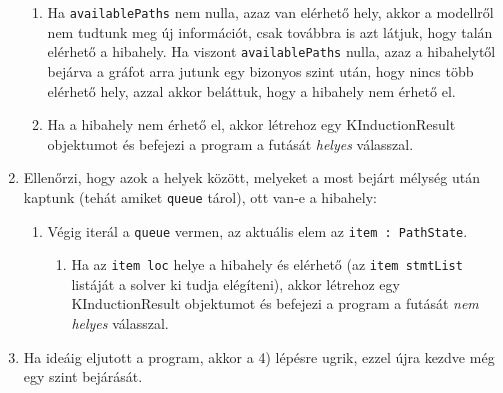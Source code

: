 \begin{enumerate}
\begin{enumerate}
		\item Ha \texttt{availablePaths} nem nulla, azaz van elérhető hely, akkor a modellről nem tudtunk meg új információt, csak továbbra is azt látjuk, hogy talán elérhető a hibahely. Ha viszont \texttt{availablePaths} nulla, azaz a hibahelytől bejárva a gráfot arra jutunk egy bizonyos szint után, hogy nincs több elérhető hely, azzal akkor beláttuk, hogy a hibahely nem érhető el.
		\item Ha a hibahely nem érhető el, akkor létrehoz egy KInductionResult objektumot és befejezi a program a futását \textit{helyes} válasszal.
	\end{enumerate}
	\item Ellenőrzi, hogy azok a helyek között, melyeket a most bejárt mélység után kaptunk (tehát amiket \texttt{queue} tárol), ott van-e a hibahely:
	\begin{enumerate}
		\item Végig iterál a \texttt{queue} vermen, az aktuális elem az \texttt{item : PathState}.
		\begin{enumerate}
			\item Ha az \texttt{item loc} helye a hibahely és elérhető (az \texttt{item stmtList} listáját a solver ki tudja elégíteni), akkor létrehoz egy KInductionResult objektumot és befejezi a program a futását \textit{nem helyes} válasszal.
		\end{enumerate}
	\end{enumerate}
	\item Ha ideáig eljutott a program, akkor a 4) lépésre ugrik, ezzel újra kezdve még egy szint bejárását.
\end{enumerate}

